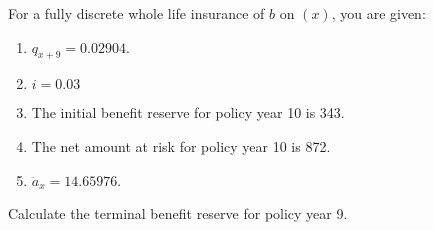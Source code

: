  For a fully discrete whole life insurance of $b$ on $(x)$, you are given:
\begin{enumerate}
\item $q_{x+9} = 0.02904$.
\item $i = 0.03$
\item The initial benefit reserve for policy year 10 is 343.
\item The net amount at risk for policy year 10 is 872.
\item $\ddot{a}_x =14.65976$.
\end{enumerate}
Calculate the terminal benefit reserve for policy year 9.
